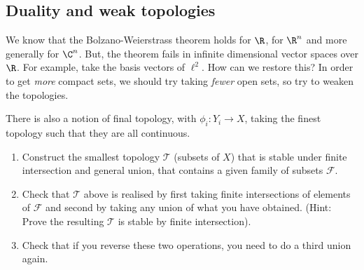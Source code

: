 \documentclass[twoside]{article}
\begin{document}
\clearpage
\subsection{Duality and weak topologies}
We know that the Bolzano-Weierstrass theorem holds for $\R$, for $\R^n$ and more generally for $\C^n$.
But, the theorem fails in infinite dimensional vector spaces over $\R$. For example, take the basis vectors of $\ell^2$.
How can we restore this?
In order to get \emph{more} compact sets, we should try taking \emph{fewer} open sets, so try to weaken the topologies.
\begin{remark}
    There is also a notion of \hypertarget{def:finalTop}{final topology}, with $\phi_i: Y_i \to X$, taking the finest topology such that they are all continuous.
\end{remark}
\begin{ex}\leavevmode
    \begin{enumerate}[label=(\arabic*)]
        \item Construct the smallest topology $\mathscr{T}$ (subsets of $X$) that is stable under finite intersection and general union, that contains a given family of subsets $\mathcal{F}$.
        \item Check that $\mathscr{T}$ above is realised by first taking finite intersections of elements of $\mathcal{F}$ and second by taking any union of what you have obtained. (Hint: Prove the resulting $\mathscr{T}$ is stable by finite intersection).
        \item Check that if you reverse these two operations, you need to do a third union again.
    \end{enumerate}
\end{ex}
\end{document}
